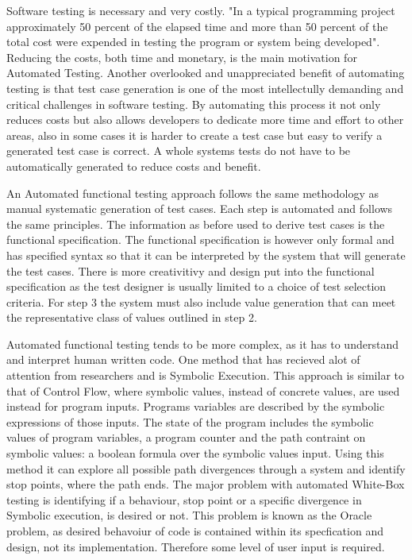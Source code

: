 \documentclass[a4paper,12pt]{article}
\begin{document}
\vspace{5mm}
\par Software testing is necessary and very costly. "In a typical programming project approximately 50 percent of the elapsed time and more than 50 percent of the total cost were expended in testing the program or system being developed"\cite{myers2011art}. Reducing the costs, both time and monetary, is the main motivation for Automated Testing. Another overlooked and unappreciated benefit of automating testing is that test case generation is one of the most intellectully demanding and critical challenges in software testing.\cite{anand2013orchestrated} By automating this process it not only reduces costs but also allows developers to dedicate more time and effort to other areas, also in some cases it is harder to create a test case but easy to verify a generated test case is correct. A whole systems tests do not have to be automatically generated to reduce costs and benefit.
\vspace{5mm}
\par An Automated functional testing approach follows the same methodology as manual systematic generation of test cases. Each step is automated and follows the same principles. The information as before used to derive test cases is the functional specification. The functional specification is however only formal  and has specified syntax so that it can be interpreted by the system that will generate the test cases. There is more creativitivy and design put into the functional specification as the test designer is usually limited to a choice of test selection criteria. For step 3 the system must also include value generation that can meet the representative class of values outlined in step 2.\cite{young2008software}
\vspace{5mm}
\par Automated functional testing tends to be more complex, as it has to understand and interpret human written code. One method that has recieved alot of attention from researchers and is Symbolic Execution. This approach is similar to that of Control Flow, where symbolic values, instead of concrete values, are used instead for program inputs. Programs variables are described by the symbolic expressions of those inputs. The state of the program includes the symbolic values of program variables, a program counter and the path contraint on symbolic values: a boolean formula over the symbolic values input. Using this method it can explore all possible path divergences through a system and identify stop points, where the path ends. The major problem with automated White-Box testing is identifying if a behaviour, stop point or a specific divergence in Symbolic execution, is desired or not. This problem is known as the Oracle problem, as desired behavoiur of code is contained within its specfication and design, not its implementation. Therefore some level of user input is required.\cite{anand2013orchestrated}
\end{document}
